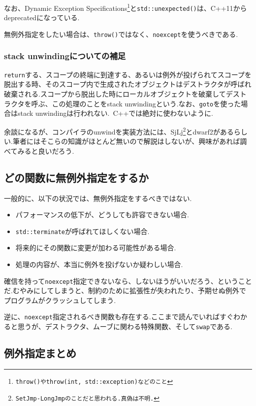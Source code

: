 \documentclass[a4j,11pt,openright]{jsbook}
\begin{document}
なお、Dynamic Exception Specifications\footnote{\texttt{throw()やthrow(int, std::exception)などのこと}}と\verb|std::unexpected()|は、C++11からdeprecatedになっている.\newline

無例外指定をしたい場合は、\verb|throw()|ではなく、\verb|noexcept|を使うべきである.

\subsubsection{stack unwindingについての補足}

\verb|return|する、スコープの終端に到達する、あるいは例外が投げられてスコープを脱出する時、そのスコープ内で生成されたオブジェクトはデストラクタが呼ばれ破棄される.スコープから脱出した時にローカルオブジェクトを破棄してデストラクタを呼ぶ、この処理のことをstack unwindingという.なお、\verb|goto|を使った場合はstack unwindingは行われない.\ C++では絶対に使わないように.

余談になるが、コンパイラのunwindを実装方法には、SjLj\footnote{\texttt{SetJmp-LongJmpのことだと思われる.真偽は不明.}}とdwarf2があるらしい.筆者にはそこらの知識がほとんど無いので解説はしないが、興味があれば調べてみると良いだろう.

\subsection{どの関数に無例外指定をするか}

一般的に、以下の状況では、無例外指定をするべきではない.

\begin{itemize}
  \item パフォーマンスの低下が、どうしても許容できない場合.
  \item \verb|std::terminate|が呼ばれてほしくない場合.
  \item 将来的にその関数に変更が加わる可能性がある場合.
  \item 処理の内容が、本当に例外を投げないか疑わしい場合.
\end{itemize}

確信を持って\verb|noexcept|指定できないなら、しないほうがいいだろう、ということだ.むやみにしてしまうと、制約のために拡張性が失われたり、予期せぬ例外でプログラムがクラッシュしてしまう.

逆に、\verb|noexcept|指定されるべき関数も存在する.ここまで読んでいればすぐわかると思うが、デストラクタ、ムーブに関わる特殊関数、そして\verb|swap|である.

\subsection{例外指定まとめ}
\end{document}
